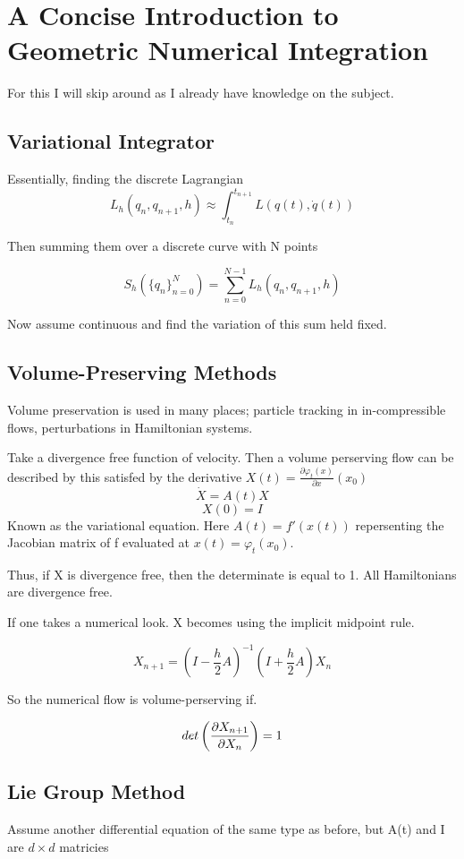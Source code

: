 \chapter{A Concise Introduction to Geometric Numerical Integration}

For this I will skip around as I already have knowledge on the subject.

\section{Variational Integrator}

Essentially, finding the discrete Lagrangian
\[
L_h(q_n, q_{n+1}, h) \approx \int_{t_n}^{t_{n+1}} L(q(t), \dot{q}(t))
  \]

  Then summing them over a discrete curve with N points

\[
    S_h(\{q_n\}^N_{n=0}) = \sum_{n=0}^{N-1}L_h (q_n, q_{n+1}, h)
  \]

  Now assume continuous and find the variation of this sum held fixed.

\section{Volume-Preserving Methods}

Volume preservation is used in many places; particle tracking in in-compressible flows, perturbations in Hamiltonian systems.

Take a divergence free function of velocity. Then a volume perserving flow can be described by this satisfed by the derivative $X(t) = \frac{\partial \varphi_t(x)}{\partial x}(x_0)$
\[
\dot{X} = A(t)X
  \]
\[
X(0) = I
\]
Known as the variational equation. Here $A(t) = f'(x(t))$ repersenting the Jacobian matrix of f evaluated at $x(t) = \varphi_t(x_0)$.

Thus, if X is divergence free, then the determinate is equal to 1. All Hamiltonians are divergence free.


If one takes a numerical look. X becomes using the implicit midpoint rule.

\[
X_{n+1} = (I - \frac{h}{2} A)^{-1}(I+\frac{h}{2}A) X_n
  \]

  So the numerical flow is volume-perserving if.

\[
det \left(\pdv{X_{n+1}}{X_n}  \right) = 1
  \]


\section{Lie Group Method}
 Assume another differential equation of the same type as before, but A(t) and I are $d \times d$ matricies

